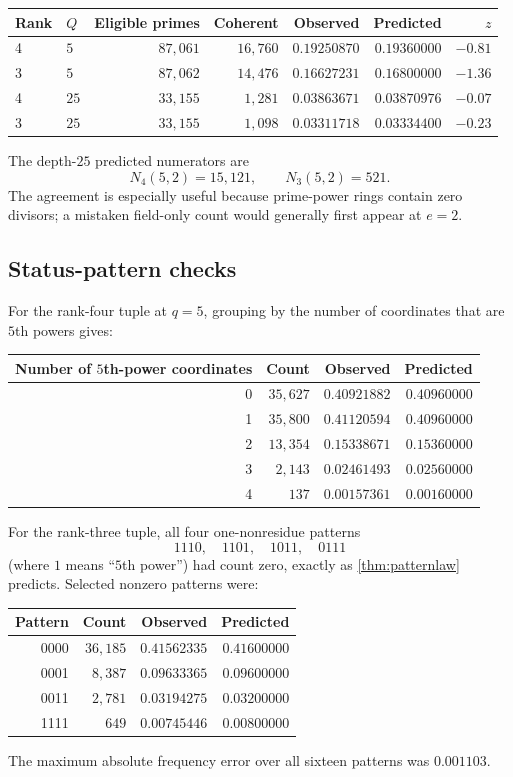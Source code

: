\documentclass[11pt]{article}
\theoremstyle{definition}
\theoremstyle{remark}
\begin{document}
\begin{center}
\begin{tabular}{llrrrrr}
\toprule
Rank & $Q$ & Eligible primes & Coherent & Observed & Predicted & $z$\\
\midrule
4 & $5$  & $87{,}061$ & $16{,}760$ & $0.19250870$ & $0.19360000$ & $-0.81$\\
3 & $5$  & $87{,}062$ & $14{,}476$ & $0.16627231$ & $0.16800000$ & $-1.36$\\
4 & $25$ & $33{,}155$ & $1{,}281$  & $0.03863671$ & $0.03870976$ & $-0.07$\\
3 & $25$ & $33{,}155$ & $1{,}098$  & $0.03311718$ & $0.03334400$ & $-0.23$\\
\bottomrule
\end{tabular}
\end{center}
The depth-$25$ predicted numerators are
\[
       N_4(5,2)=15{,}121,
       \qquad
       N_3(5,2)=521.
\]
The agreement is especially useful because prime-power rings contain zero divisors; a mistaken
field-only count would generally first appear at $e=2$.

\subsection{Status-pattern checks}

For the rank-four tuple at $q=5$, grouping by the number of coordinates that are $5$th powers
gives:
\begin{center}
\begin{tabular}{rrrr}
\toprule
Number of $5$th-power coordinates & Count & Observed & Predicted\\
\midrule
0 & $35{,}627$ & $0.40921882$ & $0.40960000$\\
1 & $35{,}800$ & $0.41120594$ & $0.40960000$\\
2 & $13{,}354$ & $0.15338671$ & $0.15360000$\\
3 & $2{,}143$  & $0.02461493$ & $0.02560000$\\
4 & $137$      & $0.00157361$ & $0.00160000$\\
\bottomrule
\end{tabular}
\end{center}
For the rank-three tuple, all four one-nonresidue patterns
\[
1110,\quad 1101,\quad 1011,\quad 0111
\]
(where $1$ means ``$5$th power'') had count zero, exactly as
\cref{thm:patternlaw} predicts.  Selected nonzero patterns were:
\begin{center}
\begin{tabular}{rrrr}
\toprule
Pattern & Count & Observed & Predicted\\
\midrule
0000 & $36{,}185$ & $0.41562335$ & $0.41600000$\\
0001 & $8{,}387$  & $0.09633365$ & $0.09600000$\\
0011 & $2{,}781$  & $0.03194275$ & $0.03200000$\\
1111 & $649$      & $0.00745446$ & $0.00800000$\\
\bottomrule
\end{tabular}
\end{center}
The maximum absolute frequency error over all sixteen patterns was $0.001103$.
\end{document}
